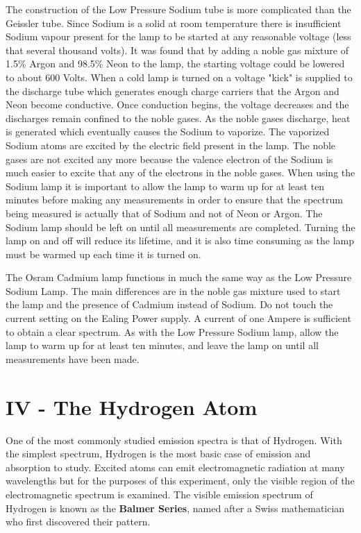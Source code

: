 The construction of the Low Pressure Sodium tube is more complicated than the Geissler tube. Since Sodium is a solid at room temperature there is insufficient Sodium vapour present for the lamp to be started at any reasonable voltage (less that several thousand volts). It was found that by adding a noble gas mixture of 1.5\% Argon and 98.5\% Neon to the lamp, the starting voltage could be lowered to about 600 Volts. When a cold lamp is turned on a voltage "kick" is supplied to the discharge tube which generates enough charge carriers that the Argon and Neon become conductive. Once conduction begins, the voltage decreases and the discharges remain confined to the noble gases. As the noble gases discharge, heat is generated which eventually causes the Sodium to vaporize. The vaporized Sodium atoms are excited by the electric field present in the lamp. The noble gases are not excited any more because the valence electron of the Sodium is much easier to excite that any of the electrons in the noble gases. When using the Sodium lamp it is important to allow the lamp to warm up for at least ten minutes before making any measurements in order to ensure that the spectrum being measured is actually that of Sodium and not of Neon or Argon. The  Sodium lamp should be left on until all measurements are completed. Turning the lamp on and off will reduce its lifetime, and it is also time consuming as the lamp must be warmed up each time it is turned on.

The Osram Cadmium lamp functions in much the same way as the Low Pressure Sodium Lamp. The main differences are in the noble gas mixture used to start the lamp and the presence of Cadmium instead of Sodium. Do not touch the current setting on the Ealing Power supply. A current of one Ampere is sufficient to obtain a clear spectrum. As with the Low Pressure Sodium lamp, allow the lamp to warm up for at least ten minutes, and leave the lamp on until all measurements have been made.

\section{IV - The Hydrogen Atom}
One of the most commonly studied emission spectra is that of Hydrogen. With the simplest spectrum, Hydrogen is the most basic case of emission and absorption to study. Excited atoms can emit electromagnetic radiation at many wavelengths but for the purposes of this experiment, only the visible region of the electromagnetic spectrum is examined. The visible emission spectrum of Hydrogen is known as the {\bf Balmer Series}, named after a Swiss mathematician who first discovered their pattern.

